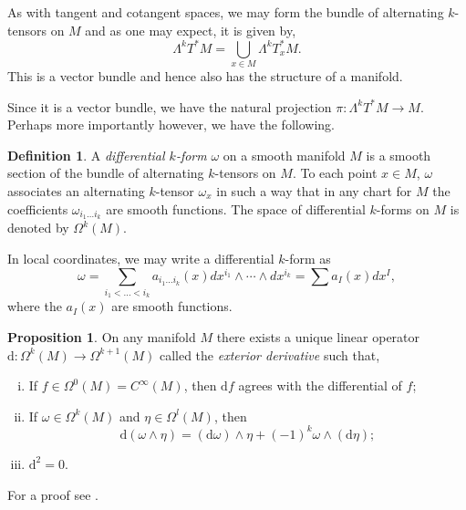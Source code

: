 \documentclass[12pt,a4paper]{article}
\numberwithin{equation}{section}
\theoremstyle{definition}
\newtheorem{definition}{Definition}[section]
\newtheorem{proposition}{Proposition}[section]
\theoremstyle{remark}
\begin{document}
As with tangent and cotangent spaces, we may form the bundle of alternating $k$-tensors on $M$ and as one may expect, it is given by,
\[
\Lambda^kT^*M=\bigcup_{x\in M}\Lambda^kT^*_xM.
\]  
This is a vector bundle and hence also has the structure of a manifold.

Since it is a vector bundle, we have the natural projection $\pi:\Lambda^kT^*M\to M$. Perhaps more importantly however, we have the following.
\begin{definition}
A \textit{differential $k$-form} $\omega$ on a smooth manifold $M$ is a smooth section of the bundle of alternating $k$-tensors on $M$. To each point $x\in M$, $\omega$ associates an alternating $k$-tensor $\omega_x$ in such a way that in any chart for $M$ the coefficients $\omega_{i_1\ldots i_k}$ are smooth functions. The space of differential $k$-forms on $M$ is denoted by $\Omega^k(M)$.
\end{definition}
In local coordinates, we may write a differential $k$-form as
\[
\omega=\sum_{i_1<\ldots<i_k}a_{i_1\ldots i_k}(x)dx^{i_1}\wedge\cdots\wedge dx^{i_k}=\sum a_I(x)dx^I,	
\]
where the $a_I(x)$ are smooth functions.
\pagebreak
\begin{proposition}
On any manifold $M$ there exists a unique linear operator $\mathrm{d}:\Omega^k(M)\to\Omega^{k+1}(M)$ called the \textit{exterior derivative} such that,
\begin{enumerate}[(i)]
\item If $f\in\Omega^0(M)=C^{\infty}(M)$, then $\mathrm{d}f$ agrees with the differential of $f$;
\item If $\omega\in\Omega^k(M)$ and $\eta\in\Omega^l(M)$, then
\[
\mathrm{d}(\omega\wedge\eta)=(\mathrm{d}\omega)\wedge\eta+(-1)^k\omega\wedge(\mathrm{d}\eta);
\]
\item $\mathrm{d}^2=0$.
\end{enumerate}
\end{proposition}
For a proof see \cite{andrews}.\\
\end{document}

